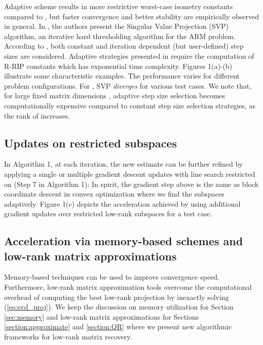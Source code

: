 \documentclass[twocolumn]{svjour3}
\begin{document}
Adaptive  scheme results in more restrictive worst-case isometry constants compared to \cite{HTP, foucart2010sparse, SVP}, but faster convergence and better stability are empirically observed in general. In \cite{SVP}, the authors present the Singular Value Projection (SVP) algorithm, an iterative hard thresholding algorithm for the ARM problem. According to \cite{SVP}, both constant and iteration dependent (but user-defined) step sizes are considered. Adaptive strategies presented in \cite{SVP} require the computation of R-RIP constants which has exponential time complexity. Figures 1(a)-(b) illustrate some characteristic examples. The performance varies for different problem configurations. For , SVP {\it diverges} for various test cases. We note that, for large fixed matrix dimensions , adaptive step size selection becomes computationally expensive compared to constant step size selection strategies, as the rank of  increases.

\subsection{Updates on restricted subspaces}

In Algorithm 1, at each iteration, the new estimate  can be further refined by applying a single or multiple gradient descent updates with line search restricted on  \cite{HTP} (Step 7 in Algorithm 1): 
  In spirit, the gradient step above is the same as block coordinate descent in convex optimization where we find the subspaces adaptively. Figure 1(c) depicts the acceleration achieved by using additional gradient updates over restricted low-rank subspaces for a test case.

\subsection{Acceleration via memory-based schemes and low-rank matrix approximations}
Memory-based techniques can be used to improve convergence speed. Furthermore, low-rank matrix approximation tools overcome the computational overhead of computing the best low-rank projection by inexactly solving (\ref{eq:svd_proj}). We keep the discussion on memory utilization for Section \ref{sec:memory} and low-rank matrix approximations for Sections \ref{section:approximate} and \ref{section:QR} where we present new algorithmic frameworks for low-rank matrix recovery.
\end{document}
